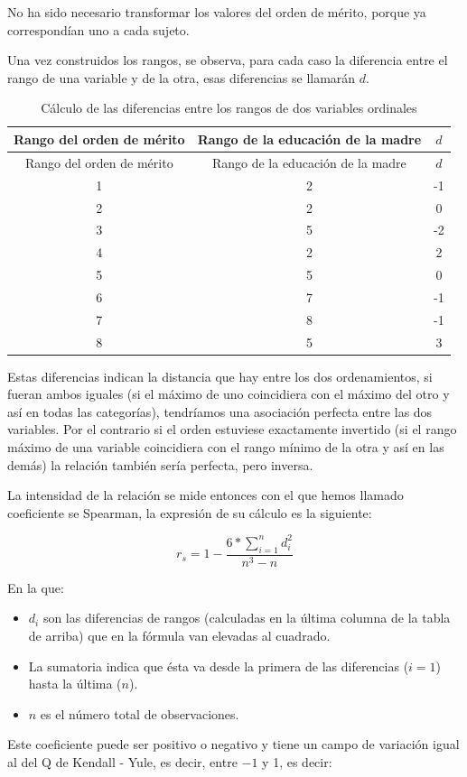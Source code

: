 \documentclass[]{book}
\begin{document}
No ha sido necesario transformar los valores del orden de mérito, porque ya correspondían uno a cada sujeto.

Una vez construidos los rangos, se observa, para cada caso la diferencia
entre el rango de una variable y de la otra, esas diferencias se
llamarán \(d\).

\begin{longtable}[]{@{}ccc@{}}
\caption{\label{tab:unnamed-chunk-163}Cálculo de las diferencias entre los rangos de dos variables ordinales}\tabularnewline
\toprule
Rango del orden de mérito & Rango de la educación de la madre & \(d\)\tabularnewline
\midrule
\endfirsthead
\toprule
Rango del orden de mérito & Rango de la educación de la madre & \(d\)\tabularnewline
\midrule
\endhead
1 & 2 & -1\tabularnewline
2 & 2 & 0\tabularnewline
3 & 5 & -2\tabularnewline
4 & 2 & 2\tabularnewline
5 & 5 & 0\tabularnewline
6 & 7 & -1\tabularnewline
7 & 8 & -1\tabularnewline
8 & 5 & 3\tabularnewline
\bottomrule
\end{longtable}

Estas diferencias indican la distancia que hay entre los dos
ordenamientos, si fueran ambos iguales (si el máximo de uno coincidiera
con el máximo del otro y así en todas las categorías), tendríamos una
asociación perfecta entre las dos variables. Por el contrario si el
orden estuviese exactamente invertido (si el rango máximo de una
variable coincidiera con el rango mínimo de la otra y así en las demás)
la relación también sería perfecta, pero inversa.

La intensidad de la relación se mide entonces con el que hemos llamado
coeficiente se Spearman, la expresión de su cálculo es la siguiente:

\[r_{s} = 1 - \frac{6*\sum_{i = 1}^{n}d_{i}^{2}}{n^{3} - n}\]

En la que:

\begin{itemize}
\item
  \(d_{i}\) son las diferencias de rangos (calculadas en la última columna de la tabla de arriba) que en la fórmula van elevadas al cuadrado.
\item
  La sumatoria indica que ésta va desde la primera de las diferencias (\(i=1\)) hasta la última (\(n\)).
\item
  \(n\) es el número total de observaciones.
\end{itemize}

Este coeficiente puede ser positivo o negativo y tiene un campo de
variación igual al del Q de Kendall - Yule, es decir, entre \(-1\) y 1, es decir:
\end{document}
